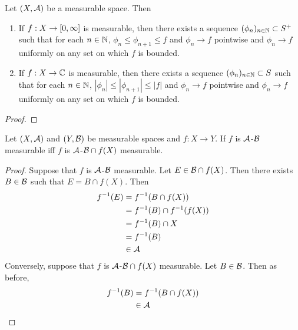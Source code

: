 \documentclass{book}
\begin{document}
	\begin{ex} 
		Let $(X, \mathcal{A})$ be a measurable space. Then 
		\begin{enumerate}
			\item If $f: X \rightarrow [0,\infty]$ is measurable, then there exists a sequence $(\phi_n)_{n \in \mathbb{N}} \subset S^+$ such that for each $n \in \mathbb{N}$, $\phi_n \leq \phi_{n+1} \leq f$ and $\phi_n \rightarrow f$ pointwise and $\phi_n \rightarrow f$ uniformly on any set on which $f$ is bounded.
			
			\item If $f: X \rightarrow \mathbb{C}$ is measurable, then there exists a sequence $(\phi_n)_{n \in \mathbb{N}} \subset S$ such that for each $n \in \mathbb{N}$, $|\phi_n| \leq |\phi_{n+1}| \leq |f|$ and $\phi_n \rightarrow f$ pointwise and $\phi_n \rightarrow f$ uniformly on any set on which $f$ is bounded.
		\end{enumerate}
	\end{ex}

	\begin{proof}
	\end{proof}
	
	\begin{ex} 
		Let $(X, \mathcal{A})$ and $(Y, \mathcal{B})$ be measurable spaces and $f: X \rightarrow Y$. If $f$ is $\mathcal{A}$-$\mathcal{B}$ measurable iff $f$ is $\mathcal{A}$-$\mathcal{B} \cap f(X)$ measurable.
	\end{ex}	
	
	\begin{proof}
		Suppose that $f$ is $\mathcal{A}$-$\mathcal{B}$ measurable. Let $E \in \mathcal{B} \cap f(X)$. Then there exists $B \in \mathcal{B}$ such that $E = B \cap f(X)$. Then 
		\begin{align*}
			f^{-1}(E)
			&= f^{-1}(B \cap f(X)) \\
			&= f^{-1}(B) \cap f^{-1}(f(X)) \\
			&= f^{-1}(B) \cap X \\
			&= f^{-1}(B) \\
			& \in \mathcal{A}
		\end{align*}
		Conversely, suppose that $f$ is  $\mathcal{A}$-$\mathcal{B} \cap f(X)$ measurable. Let $B \in \mathcal{B}$. Then as before, 
		\begin{align*}
			f^{-1}(B) 
			&= f^{-1}(B \cap f(X))  \\
			& \in \mathcal{A} 
		\end{align*}
	\end{proof}
	
\end{document}

